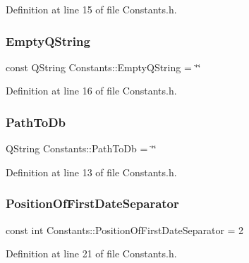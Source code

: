 Definition at line 15 of file Constants.\+h.

\hypertarget{classConstants_a60b54ff297949426391e55991f80ccf2}{}\label{classConstants_a60b54ff297949426391e55991f80ccf2} 
\subsubsection{\texorpdfstring{Empty\+Q\+String}{EmptyQString}}
{\footnotesize\ttfamily const Q\+String Constants\+::\+Empty\+Q\+String = \char`\"{}\char`\"{}\hspace{0.3cm}{\ttfamily [static]}}



Definition at line 16 of file Constants.\+h.

\hypertarget{classConstants_a2a8fc008322275c6dfbc1f18a781c405}{}\label{classConstants_a2a8fc008322275c6dfbc1f18a781c405} 
\subsubsection{\texorpdfstring{Path\+To\+Db}{PathToDb}}
{\footnotesize\ttfamily Q\+String Constants\+::\+Path\+To\+Db = \char`\"{}\char`\"{}\hspace{0.3cm}{\ttfamily [static]}}



Definition at line 13 of file Constants.\+h.

\hypertarget{classConstants_aeade44a42999a2037171cc8b04031edb}{}\label{classConstants_aeade44a42999a2037171cc8b04031edb} 
\subsubsection{\texorpdfstring{Position\+Of\+First\+Date\+Separator}{PositionOfFirstDateSeparator}}
{\footnotesize\ttfamily const int Constants\+::\+Position\+Of\+First\+Date\+Separator = 2\hspace{0.3cm}{\ttfamily [static]}}



Definition at line 21 of file Constants.\+h.

